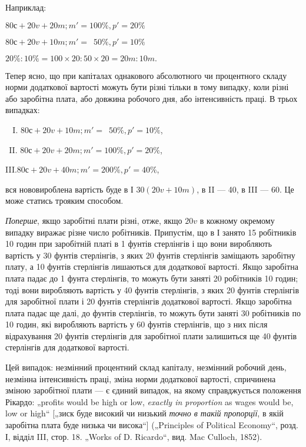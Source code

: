 Наприклад:
\begin{center}
$80 с + 20 v + 20 m; m' = 100\%, p' = 20\%$

$80 с + 20 v + 10 m; m' = \phantom{0}50\%, p' = 10\%$

$20\%:10\% = 100×20:50×20 = 20 m:10 m.$
\end{center}

Тепер ясно, що при капіталах однакового абсолютного чи
процентного складу норми додаткової вартості можуть бути
різні тільки в тому випадку, коли різні або заробітна плата,
або довжина робочого дня, або інтенсивність праці. В трьох
випадках:
\begin{center}
$\phantom{II}$I. $80 с + 20 v + 10 m; m' = \phantom{0}50\%, p' = 10\%$,

$\phantom{I}$II. $80 с + 20 v + 20 m; m' = 100\%, p' = 20\%$,

III.$80 с + 20 v + 40 m; m' = 200\%, p' = 40\%$,
\end{center}
вся нововироблена вартість буде в І $30 (20 v + 10 m)$, в II — 40,
в III — 60. Це може статись трояким способом.

\emph{Поперше}, якщо заробітні плати різні, отже, якщо $20 v$ в кожному
окремому випадку виражає різне число робітників. Припустім,
що в І занято 15 робітників 10 годин при заробітній
платі в 1    фунтів стерлінгів і що вони виробляють вартість
у 30 фунтів стерлінгів, з яких 20 фунтів стерлінгів заміщають
заробітну плату, а 10 фунтів стерлінгів лишаються для додаткової
вартості. Якщо заробітна плата падає до 1 фунта стерлінгів,
то можуть бути заняті 20 робітників 10 годин; тоді вони
виробляють вартість у 40 фунтів стерлінгів, з яких 20 фунтів
стерлінгів для заробітної плати і 20 фунтів стерлінгів додаткової
вартості. Якщо заробітна плата падає ще далі, до  фунтів
стерлінгів, то можуть бути заняті 30 робітників по 10 годин,
які виробляють вартість у 60 фунтів стерлінгів, що з них після
відрахування 20 фунтів стерлінгів для заробітної плати залишиться
ще 40 фунтів стерлінгів для додаткової вартості.

Цей випадок: незмінний процентний склад капіталу, незмінний
робочий день, незмінна інтенсивність праці, зміна норми
додаткової вартості, спричинена зміною заробітної плати — є
єдиний випадок, на якому справджується положення Рікардо:
„profits would be high or low, \emph{exactly in proportion} as wages
would be, low or high“ [„зиск буде високий чи низький \emph{точно
в такій пропорції}, в якій заробітна плата буде низька чи висока“]
(„Principles of Political Economy“, розд. І, відділ III, стор. 18.
„Works of D. Ricardo“, вид. Mac Culloch, 1852).

